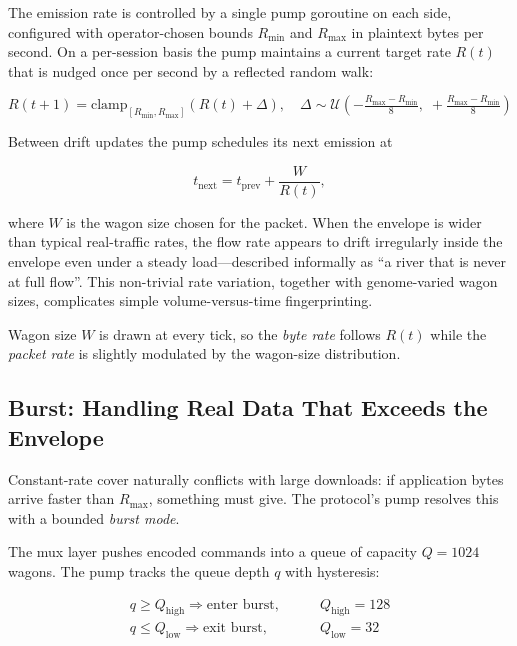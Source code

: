 \documentclass[11pt,a4paper]{article}
\begin{document}
The emission rate is controlled by a single pump goroutine on each side, configured with operator-chosen bounds $R_{\min}$ and $R_{\max}$ in plaintext bytes per second. On a per-session basis the pump maintains a current target rate $R(t)$ that is nudged once per second by a reflected random walk:

\begin{equation}\label{eq:rate_drift}
  R(t+1) = \text{clamp}_{[R_{\min}, R_{\max}]}\!\left(R(t) + \Delta\right), \quad \Delta \sim \mathcal{U}\!\left(-\tfrac{R_{\max}-R_{\min}}{8},\; +\tfrac{R_{\max}-R_{\min}}{8}\right)
\end{equation}

Between drift updates the pump schedules its next emission at

\begin{equation}\label{eq:next_send}
  t_{\text{next}} = t_{\text{prev}} + \frac{W}{R(t)},
\end{equation}

where $W$ is the wagon size chosen for the packet. When the envelope is wider than typical real-traffic rates, the flow rate appears to drift irregularly inside the envelope even under a steady load---described informally as ``a river that is never at full flow''. This non-trivial rate variation, together with genome-varied wagon sizes, complicates simple volume-versus-time fingerprinting.

Wagon size $W$ is drawn at every tick, so the \emph{byte rate} follows $R(t)$ while the \emph{packet rate} is slightly modulated by the wagon-size distribution.

\subsection{Burst: Handling Real Data That Exceeds the Envelope}\label{sec:burst}

Constant-rate cover naturally conflicts with large downloads: if application bytes arrive faster than $R_{\max}$, something must give. The protocol's pump resolves this with a bounded \emph{burst mode}.

The mux layer pushes encoded commands into a queue of capacity $Q = 1024$ wagons. The pump tracks the queue depth $q$ with hysteresis:

\begin{align}
  q \geq Q_{\text{high}} \Rightarrow \text{enter burst}, \qquad & Q_{\text{high}} = 128 \\
  q \leq Q_{\text{low}}  \Rightarrow \text{exit burst},  \qquad & Q_{\text{low}}  = 32
\end{align}
\end{document}
